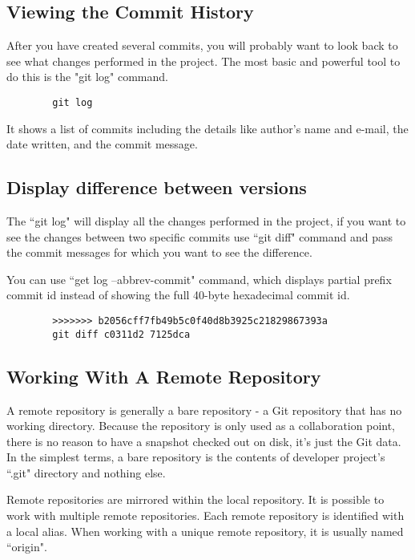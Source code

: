 \documentclass{book}
\begin{document}
    \subsection*{Viewing the Commit History}
    After you have created several commits, you will probably want to look
    back to see what changes performed in the project. The most basic and
    powerful tool to do this is the "git log" command.

    \begin{verbatim}
        git log
    \end{verbatim}
    It shows a list of commits including the details like author’s name and e-mail, the date written, and the commit message.

    \subsection*{Display difference between versions}

    The ``git log" will display all the changes performed in the project,
    if you want to see the changes between two specific commits use
    ``git diff" command and pass the commit messages for which you want to
    see the difference.

    You can use ``get log –abbrev-commit" command, which displays partial
    prefix commit id instead of showing the full 40-byte hexadecimal commit
    id.

    \begin{verbatim}
        >>>>>>> b2056cff7fb49b5c0f40d8b3925c21829867393a 
        git diff c0311d2 7125dca
    \end{verbatim}

    \subsection*{Working With A Remote Repository}

    A remote repository is generally a bare repository - a Git repository
    that has no working directory. Because the repository is only used as a
    collaboration point, there is no reason to have a snapshot checked out
    on disk, it’s just the Git data. In the simplest terms, a bare
    repository is the contents of developer project’s ``.git" directory and
    nothing else.

    Remote repositories are mirrored within the local repository. It is
    possible to work with multiple remote repositories. Each remote
    repository is identified with a local alias. When working with a unique
    remote repository, it is usually named ``origin".
\end{document}
